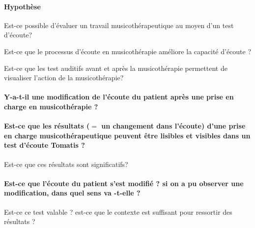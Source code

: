    
   
   
   







\paragraph{Hypothèse}

Est-ce possible d'évaluer un travail musicothérapeutique au moyen
d'un test d'écoute?

Est-ce que le processus d'écoute en musicothérapie améliore la capacité
d'écoute ?

Est-ce que les test auditifs avant et après la musicothérapie permettent
de visualiser l'action de la musicothérapie?

\paragraph{Y-a-t-il une modification de l'écoute du patient après une prise
en charge en musicothérapie ?}

\paragraph{Est-ce que les résultats ($=$ un changement dans l'écoute) d'une prise
en charge musicothérapeutique peuvent être lisibles et visibles dans
un test d'écoute Tomatis ?}

Est-ce que ces résultats sont significatifs? 

\paragraph{Est-ce que l'écoute du patient s'est modifié ? si on a pu observer
une modification, dans quel sens va -t-elle ?}

Est-ce ce test valable ? est-ce que le contexte est suffisant pour
ressortir des résultats ?





